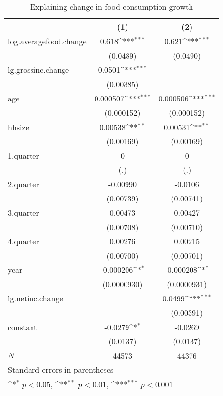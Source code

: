 \begin{table}[htbp]\centering
\def\sym#1{\ifmmode^{#1}\else\(^{#1}\)\fi}
\caption{\label{tab:logfood-deltacons} Explaining change in food consumption growth}
\begin{tabular}{l*{2}{c}}
\hline\hline
            &\multicolumn{1}{c}{(1)}         &\multicolumn{1}{c}{(2)}         \\
\hline
log.averagefood.change&       0.618\sym{***}&       0.621\sym{***}\\
            &    (0.0489)         &    (0.0490)         \\
lg.grossinc.change&      0.0501\sym{***}&                     \\
            &   (0.00385)         &                     \\
age         &    0.000507\sym{***}&    0.000506\sym{***}\\
            &  (0.000152)         &  (0.000152)         \\
hhsize      &     0.00538\sym{**} &     0.00531\sym{**} \\
            &   (0.00169)         &   (0.00169)         \\
1.quarter   &           0         &           0         \\
            &         (.)         &         (.)         \\
2.quarter   &    -0.00990         &     -0.0106         \\
            &   (0.00739)         &   (0.00741)         \\
3.quarter   &     0.00473         &     0.00427         \\
            &   (0.00708)         &   (0.00710)         \\
4.quarter   &     0.00276         &     0.00215         \\
            &   (0.00700)         &   (0.00701)         \\
year        &   -0.000206\sym{*}  &   -0.000208\sym{*}  \\
            & (0.0000930)         & (0.0000931)         \\
lg.netinc.change&                     &      0.0499\sym{***}\\
            &                     &   (0.00391)         \\
constant    &     -0.0279\sym{*}  &     -0.0269         \\
            &    (0.0137)         &    (0.0137)         \\
\hline
\(N\)       &       44573         &       44376         \\
\hline\hline
\multicolumn{3}{l}{\footnotesize Standard errors in parentheses}\\
\multicolumn{3}{l}{\footnotesize \sym{*} \(p<0.05\), \sym{**} \(p<0.01\), \sym{***} \(p<0.001\)}\\
\end{tabular}
\end{table}
